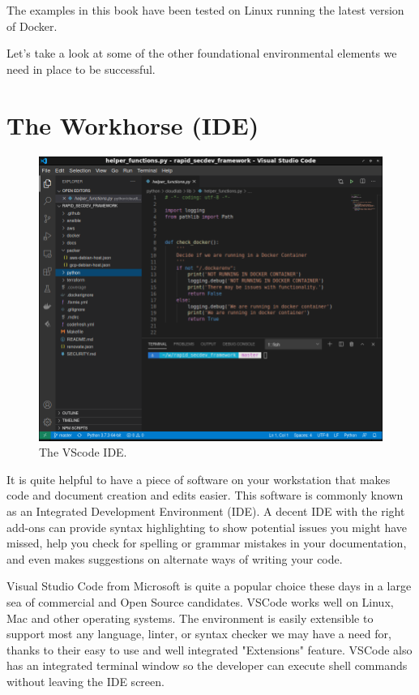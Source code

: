\justify
The examples in this book have been tested on Linux running the latest
version of Docker.

\justify
Let's take a look at some of the other foundational environmental
elements we need in place to be successful.

\section{The Workhorse (IDE)}
\begin{figure}
	\centering
	\includegraphics[scale=0.45]{../images/setup-vscode.png}
	\caption{The VScode IDE.}
\end{figure}
\justify
It is quite helpful to have a piece of software on your workstation that
makes code and document creation and edits easier. This software is
commonly known as an Integrated Development Environment (IDE).
A decent IDE with the right add-ons can provide syntax highlighting to show
potential issues you might have missed, help you check for spelling or
grammar mistakes in your documentation, and even makes suggestions on
alternate ways of writing your code.

\justify
Visual Studio Code from Microsoft is quite a popular choice these
days in a large sea of commercial and Open Source candidates.
VSCode works well on Linux, Mac and other operating systems.
The environment is easily extensible to support most any language,
linter, or syntax checker we may have a need
for, thanks to their easy to use and well integrated "Extensions"
feature. VSCode also has an integrated terminal window
so the developer can execute shell commands without leaving the IDE screen.

